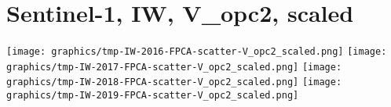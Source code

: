 
\section{Sentinel-1, IW, V\_opc2, scaled}
\setcounter{theorem}{0}

\renewcommand{\theenumi}{\roman{enumi}}
\renewcommand{\labelenumi}{\textnormal{(\theenumi)}$\;\;$}


\begin{center}
\begin{minipage}{7.0in}
\texttt{[image: graphics/tmp-IW-2016-FPCA-scatter-V\_opc2\_scaled.png]}
\quad
\texttt{[image: graphics/tmp-IW-2017-FPCA-scatter-V\_opc2\_scaled.png]}
\vskip 0.5cm
\texttt{[image: graphics/tmp-IW-2018-FPCA-scatter-V\_opc2\_scaled.png]}
\quad
\texttt{[image: graphics/tmp-IW-2019-FPCA-scatter-V\_opc2\_scaled.png]}
\end{minipage}
\end{center}


\renewcommand{\theenumi}{\roman{enumi}}
\renewcommand{\labelenumi}{\textnormal{(\theenumi)}$\;\;$}


